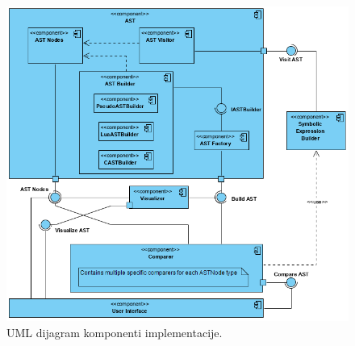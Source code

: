 \begin{figure}[h!]
\centering
\includegraphics[scale=0.8]{images/uml/ComponentDiagram.png}
\caption{UML dijagram komponenti implementacije.}
\label{fig:ImplementationComponents}
\end{figure}







